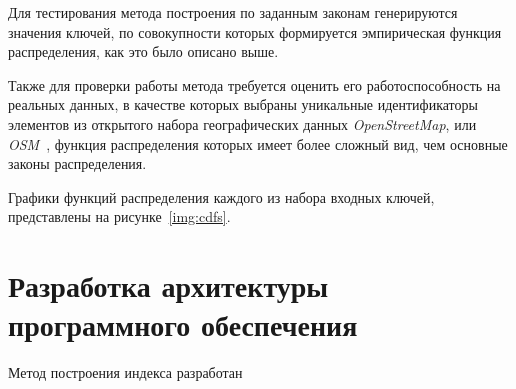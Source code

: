 Для тестирования метода построения по заданным законам генерируются значения
ключей, по совокупности которых формируется эмпирическая функция распределения,
как это было описано выше.

Также для проверки работы метода требуется оценить его работоспособность на
реальных данных, в качестве которых выбраны уникальные идентификаторы элементов
из открытого набора географических данных \textit{OpenStreetMap}, или
\textit{OSM}~\cite{osm}, функция распределения которых имеет более сложный вид,
чем основные законы распределения.

Графики функций распределения каждого из набора входных ключей, представлены на
рисунке~\ref{img:cdfs}.


\section{Разработка архитектуры программного обеспечения}

Метод построения индекса разработан 

